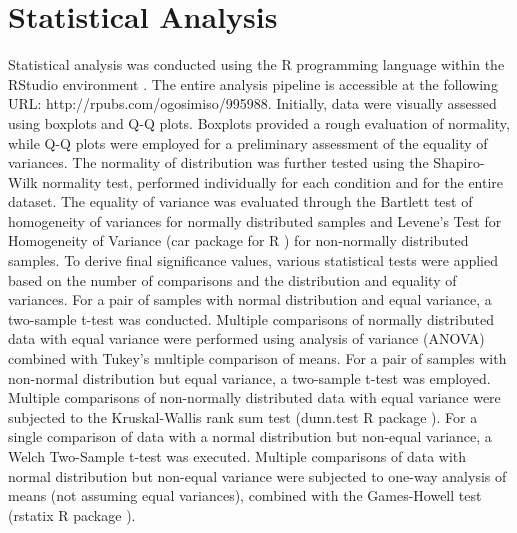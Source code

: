 \section{Statistical Analysis} \label{sec:Statistical Analysis}
Statistical analysis was conducted using the R programming language \cite{RCoreTeam2022R:Computing} within the RStudio environment \cite{RStudioTeam2022RStudio:RStudio}. The entire analysis pipeline is accessible at the following URL: http://rpubs.com/ogosimiso/995988. Initially, data were visually assessed using boxplots and Q-Q plots. Boxplots provided a rough evaluation of normality, while Q-Q plots were employed for a preliminary assessment of the equality of variances. The normality of distribution was further tested using the Shapiro-Wilk normality test, performed individually for each condition and for the entire dataset. The equality of variance was evaluated through the Bartlett test of homogeneity of variances for normally distributed samples and Levene's Test for Homogeneity of Variance (car package for R \cite{Fox2019AnRegression}) for non-normally distributed samples. To derive final significance values, various statistical tests were applied based on the number of comparisons and the distribution and equality of variances. For a pair of samples with normal distribution and equal variance, a two-sample t-test was conducted. Multiple comparisons of normally distributed data with equal variance were performed using analysis of variance (ANOVA) combined with Tukey's multiple comparison of means. For a pair of samples with non-normal distribution but equal variance, a two-sample t-test was employed. Multiple comparisons of non-normally distributed data with equal variance were subjected to the Kruskal-Wallis rank sum test (dunn.test R package \cite{Dinno2017Dunn.test:Sums}). For a single comparison of data with a normal distribution but non-equal variance, a Welch Two-Sample t-test was executed. Multiple comparisons of data with normal distribution but non-equal variance were subjected to one-way analysis of means (not assuming equal variances), combined with the Games-Howell test (rstatix R package \cite{Kassambara2022Rstatix:Tests}).

